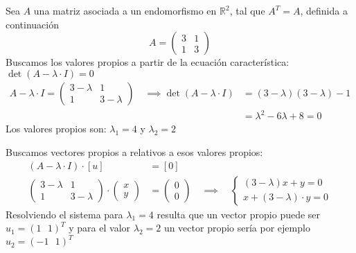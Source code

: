 \ejemplo

Sea \(A\) una matriz asociada a un endomorfismo en \(\mathbb{R}^2\), tal que \(A^T = A\), definida a continuación
\[
  A = \begin{pmatrix}
    3 & 1 \\
    1 & 3
  \end{pmatrix}
\]
Buscamos los valores propios a partir de la ecuación característica: \(\det (A - \lambda \cdot I) = 0\)
\begin{align*}
A - \lambda \cdot I = \begin{pmatrix}
  3-\lambda & 1 \\
  1 & 3-\lambda
\end{pmatrix} \quad \implies \det (A-\lambda \cdot I) &= (3-\lambda)(3-\lambda)-1\\
&= \lambda^2 -6\lambda + 8 = 0
\end{align*}
Los valores propios son: \(\lambda_1 = 4\) y \(\lambda_2=2\)

Buscamos vectores propios a relativos a esos valores propios:
\begin{align*}
  (A-\lambda \cdot I) \cdot [u] &= [0] \\
  \begin{pmatrix}
    3-\lambda & 1 \\
    1 & 3-\lambda
  \end{pmatrix} \cdot \begin{pmatrix}
    x\\ y
  \end{pmatrix} &= \begin{pmatrix}
    0 \\ 0
  \end{pmatrix} \quad \implies \quad \begin{cases}
    (3-\lambda)x + y =0\\
    x +(3-\lambda) \cdot y = 0
  \end{cases} 
\end{align*}
Resolviendo el sistema para \(\lambda_1 = 4\) resulta que un vector propio puede ser \(u_1 = (1 ~~~ 1)^T\) y para el valor \(\lambda_2 = 2\) un vector propio sería por ejemplo \(u_2 = (-1 ~~~ 1)^T\)


